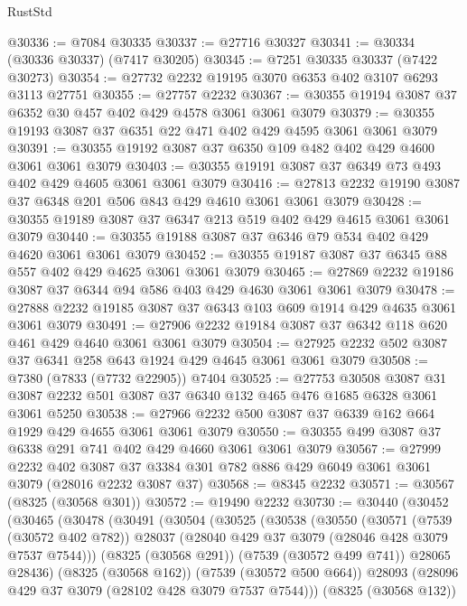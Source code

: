 \begin{lexlean}{RustStd}
\begin{coremodule}
@30336 := @7084 @30335
@30337 := @27716 @30327
@30341 := @30334 (@30336 @30337) (@7417 @30205)
@30345 := @7251 @30335 @30337 (@7422 @30273)
@30354 := @27732 @2232 @19195 @3070 @6353 @402 @3107 @6293 @3113 @27751
@30355 := @27757 @2232
@30367 := @30355 @19194 @3087 @37 @6352 @30 @457 @402 @429 @4578 @3061 @3061 @3079
@30379 := @30355 @19193 @3087 @37 @6351 @22 @471 @402 @429 @4595 @3061 @3061 @3079
@30391 := @30355 @19192 @3087 @37 @6350 @109 @482 @402 @429 @4600 @3061 @3061 @3079
@30403 := @30355 @19191 @3087 @37 @6349 @73 @493 @402 @429 @4605 @3061 @3061 @3079
@30416 := @27813 @2232 @19190 @3087 @37 @6348 @201 @506 @843 @429 @4610 @3061 @3061 @3079
@30428 := @30355 @19189 @3087 @37 @6347 @213 @519 @402 @429 @4615 @3061 @3061 @3079
@30440 := @30355 @19188 @3087 @37 @6346 @79 @534 @402 @429 @4620 @3061 @3061 @3079
@30452 := @30355 @19187 @3087 @37 @6345 @88 @557 @402 @429 @4625 @3061 @3061 @3079
@30465 := @27869 @2232 @19186 @3087 @37 @6344 @94 @586 @403 @429 @4630 @3061 @3061 @3079
@30478 := @27888 @2232 @19185 @3087 @37 @6343 @103 @609 @1914 @429 @4635 @3061 @3061 @3079
@30491 := @27906 @2232 @19184 @3087 @37 @6342 @118 @620 @461 @429 @4640 @3061 @3061 @3079
@30504 := @27925 @2232 @502 @3087 @37 @6341 @258 @643 @1924 @429 @4645 @3061 @3061 @3079
@30508 := @7380 (@7833 (@7732 @22905)) @7404
@30525 := @27753
    @30508
    @3087
    @31
    @3087
    @2232
    @501
    @3087
    @37
    @6340
    @132
    @465
    @476
    @1685
    @6328
    @3061
    @3061
    @5250
@30538 := @27966 @2232 @500 @3087 @37 @6339 @162 @664 @1929 @429 @4655 @3061 @3061 @3079
@30550 := @30355 @499 @3087 @37 @6338 @291 @741 @402 @429 @4660 @3061 @3061 @3079
@30567 := @27999
    @2232
    @402
    @3087
    @37
    @3384
    @301
    @782
    @886
    @429
    @6049
    @3061
    @3061
    @3079
    (@28016 @2232 @3087 @37)
@30568 := @8345 @2232
@30571 := @30567 (@8325 (@30568 @301))
@30572 := @19490 @2232
@30730 := @30440
    (@30452
      (@30465
        (@30478
          (@30491
            (@30504
              (@30525
                (@30538
                  (@30550
                    (@30571
                      (@7539 (@30572 @402 @782))
                      @28037
                      (@28040 @429 @37 @3079 (@28046 @428 @3079 @7537 @7544)))
                    (@8325 (@30568 @291))
                    (@7539 (@30572 @499 @741))
                    @28065
                    @28436)
                  (@8325 (@30568 @162))
                  (@7539 (@30572 @500 @664))
                  @28093
                  (@28096 @429 @37 @3079 (@28102 @428 @3079 @7537 @7544)))
                (@8325 (@30568 @132))

\end{coremodule}
\end{lexlean}
